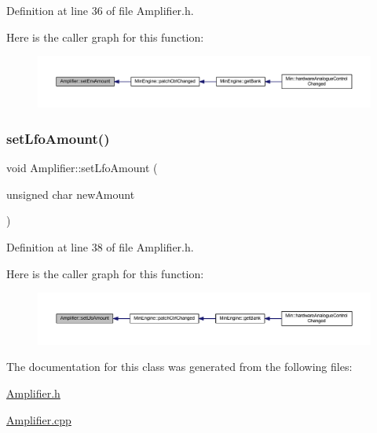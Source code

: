 Definition at line 36 of file Amplifier.\+h.

Here is the caller graph for this function\+:
\nopagebreak
\begin{figure}[H]
\begin{center}
\leavevmode
\includegraphics[width=350pt]{class_amplifier_a1106605e158c9855d4e303e6972baf9f_icgraph}
\end{center}
\end{figure}
\mbox{\label{class_amplifier_a99593afade53ffadc6958861e38b612a}} 
\subsubsection{\texorpdfstring{set\+Lfo\+Amount()}{setLfoAmount()}}
{\footnotesize\ttfamily void Amplifier\+::set\+Lfo\+Amount (\begin{DoxyParamCaption}\item[{unsigned char}]{new\+Amount }\end{DoxyParamCaption})\hspace{0.3cm}{\ttfamily [inline]}}



Definition at line 38 of file Amplifier.\+h.

Here is the caller graph for this function\+:
\nopagebreak
\begin{figure}[H]
\begin{center}
\leavevmode
\includegraphics[width=350pt]{class_amplifier_a99593afade53ffadc6958861e38b612a_icgraph}
\end{center}
\end{figure}


The documentation for this class was generated from the following files\+:\begin{DoxyCompactItemize}
\item 
\hyperlink{_amplifier_8h}{Amplifier.\+h}\item 
\hyperlink{_amplifier_8cpp}{Amplifier.\+cpp}\end{DoxyCompactItemize}

